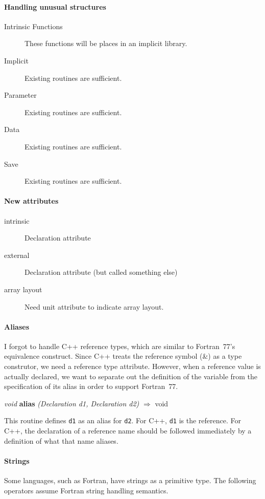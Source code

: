 \documentclass[11pt]{article}
\newcommand{\code}[1]{\texttt{#1}}
\newcommand{\interface}[4]{
\par\vspace{1ex}\noindent
  \begin{samepage}
  \textsl{#1} \textbf{#2}\index{#2} \textsl{(#3)} $\Rightarrow$ 
	\textmd{#4\index{#4}}\par
  \end{samepage}
}
\newenvironment{functionality}
               {\list{}{\rightmargin 0em
			\listparindent \parindent}%
                \item[]\hspace{\parindent}}
               {\endlist}
\begin{document}
\paragraph{Handling unusual structures}
\begin{description}
\item [Intrinsic Functions] These functions will be places in an
implicit library.  
\item [Implicit] Existing routines are sufficient.
\item [Parameter] Existing routines are sufficient.
\item [Data] Existing routines are sufficient.
\item [Save] Existing routines are sufficient.
\end{description}

\paragraph{New attributes}
\begin{description}
\item [intrinsic] Declaration attribute
\item [external] Declaration attribute (but called something else)
\item [array layout] Need unit attribute to indicate array layout.
\end{description}

\paragraph{Aliases}
I forgot to handle C++ reference types, which are similar to
Fortran~77's equivalence construct.  Since C++ treats the reference
symbol (\&) as a type construtor, we need a reference type attribute.
However, when a reference value is actually declared, we want to
separate out the definition of the variable from the specification of
its alias in order to support Fortran~77.

\interface{void}{alias}{Declaration d1, Declaration d2}{void}
\begin{functionality}
This routine defines \code{d1} as an alias for \code{d2}.  For C++,
\code{d1} is the reference.  For C++, the declaration of a reference
name should be followed immediately by a definition of what that name
aliases.  
\end{functionality}

\paragraph{Strings}
Some languages, such as Fortran, have strings as a primitive type.
The following operators assume Fortran string handling semantics.
\end{document}
